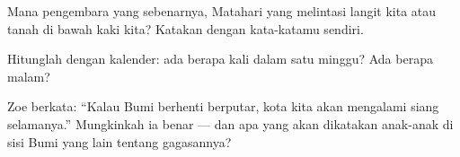 \begin{exercise}[$\star$]\label{exo:g1:day-and-night:7}
Mana pengembara yang sebenarnya, Matahari yang melintasi langit kita
atau tanah di bawah kaki kita? Katakan dengan kata-katamu sendiri.
\end{exercise}

\begin{exercise}[$\star$]\label{exo:g1:day-and-night:8}
Hitunglah dengan kalender: ada berapa kali  dalam satu
minggu? Ada berapa malam?
\end{exercise}

\begin{exercise}[$\star\star$]\label{exo:g1:day-and-night:9}
Zoe berkata: ``Kalau Bumi berhenti berputar, kota kita akan mengalami
siang selamanya.'' Mungkinkah ia benar --- dan apa yang akan dikatakan
anak-anak di sisi Bumi yang lain tentang gagasannya?
\end{exercise}
